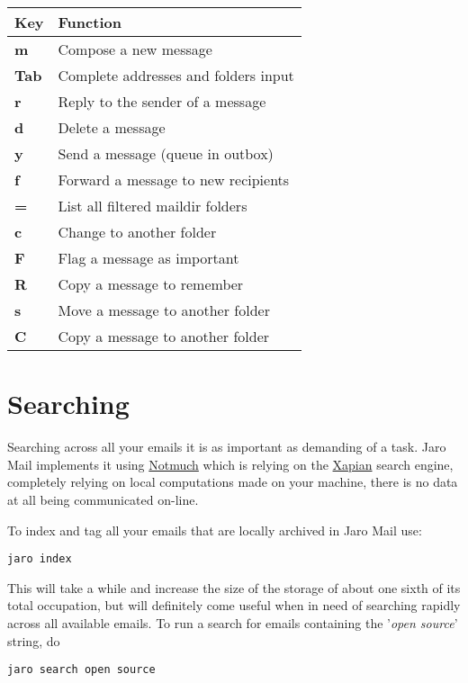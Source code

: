 \documentclass[a4,onecolumn,portrait]{article}
\begin{document}
\begin{center}
\begin{tabular}{ll}
Key & Function\\
\hline
\textbf{m} & Compose a new message\\
\textbf{Tab} & Complete addresses and folders input\\
\textbf{r} & Reply to the sender of a message\\
\textbf{d} & Delete a message\\
\textbf{y} & Send a message (queue in outbox)\\
\textbf{f} & Forward a message to new recipients\\
\textbf{=} & List all filtered maildir folders\\
\textbf{c} & Change to another folder\\
\textbf{F} & Flag a message as important\\
\textbf{R} & Copy a message to remember\\
\textbf{s} & Move a message to another folder\\
\textbf{C} & Copy a message to another folder\\
\end{tabular}
\end{center}


\section{Searching}
\label{sec-7}

Searching across all your emails it is as important as demanding of a task. Jaro Mail implements it using \href{https://notmuchmail.org/}{Notmuch} which is relying on the \href{http://xapian.org}{Xapian} search engine, completely relying on local computations made on your machine, there is no data at all being communicated on-line.

To index and tag all your emails that are locally archived in Jaro Mail use:

\begin{verbatim}
jaro index
\end{verbatim}

This will take a while and increase the size of the storage of about one sixth of its total occupation, but will definitely come useful when in need of searching rapidly across all available emails. To run a search for emails containing the '\emph{open source}' string, do

\begin{verbatim}
jaro search open source
\end{verbatim}
\end{document}
